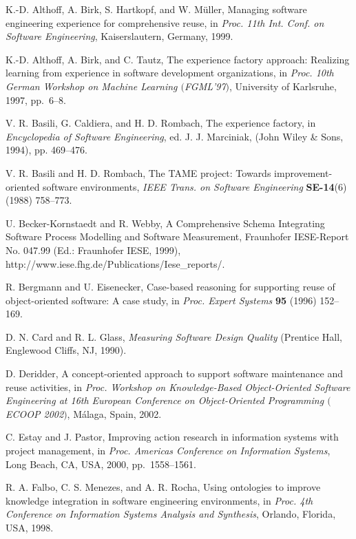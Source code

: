 \documentclass{ws-ijseke}
\begin{document}
\begin{thebibliography}{00}

 K.-D. Althoff, A. Birk, S. Hartkopf, and W. M\"{u}ller,
Managing software engineering experience for comprehensive reuse, in
{\it Proc.  11th Int. Conf. on Software Engineering}, Kaiserslautern,
Germany, 1999.

 K.-D. Althoff, A. Birk, and C. Tautz, The experience 
factory approach: Realizing learning from experience in software 
development organizations, in {\it Proc. 10th German Workshop 
on Machine Learning $($FGML'97$)$}, University of Karlsruhe, 1997, 
pp.~6--8.

 V. R. Basili, G. Caldiera, and H. D. Rombach, The
experience factory, in \textit{Encyclopedia of Software Engineering},
ed. J. J. Marciniak,  (John Wiley \& Sons, 1994), pp. 469--476.

 V. R. Basili and H. D. Rombach, The TAME project: Towards
improvement-oriented software environments, \textit{IEEE Trans.  on
Software Engineering} {\bf SE-14}(6) (1988) 758--773.

 U. Becker-Kornstaedt and R. Webby, A Comprehensive Schema 
Integrating Software Process Modelling and Software Measurement, 
Fraunhofer IESE-Report No. 047.99 (Ed.: Fraunhofer IESE, 1999), 
http://www.iese.fhg.de/Publications/Iese{\_}reports/.

 R. Bergmann and U. Eisenecker, Case-based reasoning for
supporting reuse of object-oriented software: A case study, in {\it
Proc.  Expert Systems} {\bf 95} (1996) 152--169.

 D. N. Card and R. L. Glass, \textit{Measuring Software
Design Quality} (Prentice Hall, Englewood Cliffs, NJ, 1990).

 D. Deridder, A concept-oriented approach to support software 
maintenance and reuse activities, in {\it Proc. Workshop on 
Knowledge-Based Object-Oriented Software Engineering at 16th European 
Conference on Object-Oriented Programming $($ECOOP 2002$)$}, M\'{a}laga, 
Spain, 2002.

 C. Estay and J. Pastor, Improving action research in
information systems with project management, in {\it Proc. Americas
Conference on Information Systems}, Long Beach, CA, USA, 2000,
pp.~1558--1561.

 R. A. Falbo, C. S. Menezes, and A. R. Rocha, Using
ontologies to improve knowledge integration in software engineering
environments, in {\it Proc. 4th Conference on Information Systems
Analysis and Synthesis}, Orlando, Florida, USA, 1998.
\end{thebibliography}
\end{document}
